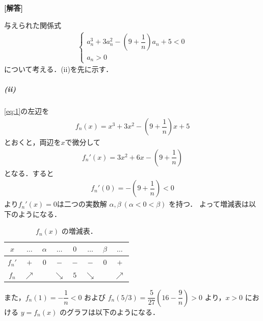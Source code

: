 \documentclass[../../main.tex]{subfiles}
\begin{document}
\begin{oframed}
  
\end{oframed}

{\bf [解答]}

与えられた関係式
\begin{align}
  \begin{cases}
    a_n^3 + 3 a_n^2 - \left(9 + \dfrac{1}{n}\right) a_n + 5 < 0 \\
    a_n > 0
  \end{cases} \label{eq:1}
\end{align}
について考える．(ii)を先に示す．

\subparagraph{(ii)}

\cref{eq:1}の左辺を
\begin{align}
  f_n(x) = x^3 + 3x^2 - \left(9 + \dfrac{1}{n}\right) x + 5
\end{align}
とおくと，両辺を$x$で微分して
\begin{align}
  f_n'(x) = 3x^2 + 6x - \left(9 + \dfrac{1}{n}\right)
\end{align}
となる．すると
\begin{align}
  f_n'(0) = - \left(9 + \dfrac{1}{n}\right) < 0
\end{align}
より$f_n'(x)=0$は二つの実数解 $\alpha, \beta \ (\alpha < 0 < \beta)$ を持つ．
よって増減表は以下のようになる．

\begin{table}[htb]
  \centering
  \caption{$f_n(x)$ の増減表．}
  \begin{tabular}{c|ccccccc}
    $x$ & $\dots$ & $\alpha$ & $\dots$ & $0$ & $\dots$ & $\beta$ & $\dots$ \\ \hline
    $f_n'$ & $+$ & $0$ & $-$ & $-$ & $-$ & $0$ & $+$ \\ \hline
    $f_n$ & $\nearrow$ & & $\searrow$ & $5$ & $\searrow$ & & $\nearrow$
  \end{tabular}
\end{table}

また，$f_n(1)=-\dfrac{1}{n}<0$ および $f_n(5/3)=\dfrac{5}{27}\left(16-\dfrac{9}{n}\right)>0$ より，$x>0$ における $y=f_n(x)$ のグラフは以下のようになる．
\end{document}

